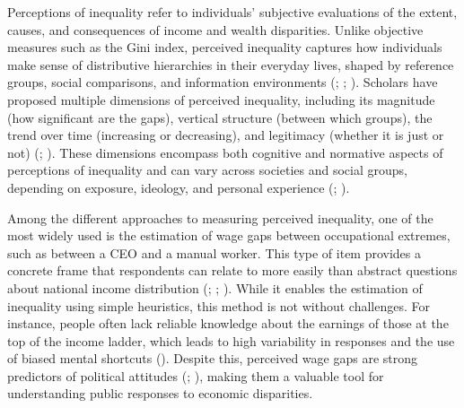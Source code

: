 \documentclass[
  12pt,
]{article}
\begin{document}
Perceptions of inequality refer to individuals' subjective evaluations
of the extent, causes, and consequences of income and wealth
disparities. Unlike objective measures such as the Gini index, perceived
inequality captures how individuals make sense of distributive
hierarchies in their everyday lives, shaped by reference groups, social
comparisons, and information environments
(; ; ).
Scholars have proposed multiple dimensions of perceived inequality,
including its magnitude (how significant are the gaps), vertical
structure (between which groups), the trend over time (increasing or
decreasing), and legitimacy (whether it is just or not)
(;
). These dimensions encompass both cognitive and normative aspects
of perceptions of inequality and can vary across societies and social
groups, depending on exposure, ideology, and personal experience
(;
).

Among the different approaches to measuring perceived inequality, one of
the most widely used is the estimation of wage gaps between occupational
extremes, such as between a CEO and a manual worker. This type of item
provides a concrete frame that respondents can relate to more easily
than abstract questions about national income distribution
(;
;
). While it
enables the estimation of inequality using simple heuristics, this
method is not without challenges. For instance, people often lack
reliable knowledge about the earnings of those at the top of the income
ladder, which leads to high variability in responses and the use of
biased mental shortcuts (). Despite this, perceived wage gaps are strong predictors of
political attitudes
(; ),
making them a valuable tool for understanding public responses to
economic disparities.
\end{document}
